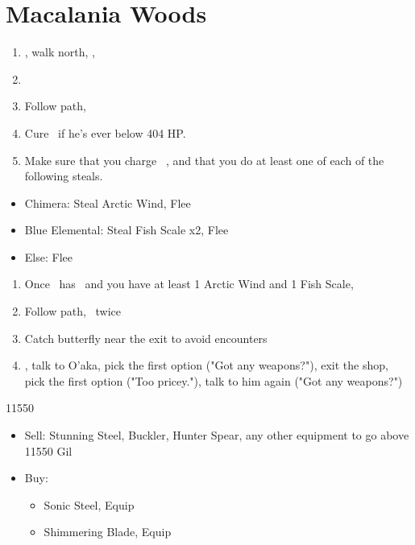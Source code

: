 \chapter{Macalania Woods}

\begin{enumerate}
    \item \sd, walk north, \sd, \save
    \item \formation{\tidus}{\rikku}{\auron}
    \item Follow path, 
    \item Cure \tidus\ if he's ever below 404 HP.
    \item Make sure that you charge \rikku\ \od, and that you do at least one of each of the following steals.
\end{enumerate}
\begin{encounters}
    \begin{itemize}
        \item Chimera: Steal Arctic Wind, Flee
        \item Blue Elemental: Steal Fish Scale x2, Flee
        \item Else: Flee
    \end{itemize}
\end{encounters}
\begin{enumerate}[resume]
    \item Once \rikku\ has \od\ and you have at least 1 Arctic Wind and 1 Fish Scale, \formation{\tidus}{\yuna}{\kimahri}
    \item Follow path, \sd\ twice
    \item Catch butterfly near the exit to avoid encounters
    \formation{\tidus}{\yuna}{\kimahri}
    \item \save, talk to O'aka, pick the first option ("Got any weapons?"), exit the shop, pick the first option ("Too pricey."), talk to him again ("Got any weapons?")
\end{enumerate}
\begin{shop}{11550}
    \begin{itemize}
        \item Sell: Stunning Steel, Buckler, Hunter Spear, any other equipment to go above 11550 Gil
        \item Buy:
        \begin{itemize}
            \item Sonic Steel, Equip
            \item Shimmering Blade, Equip
        \end{itemize}
    \end{itemize}
\end{shop}
